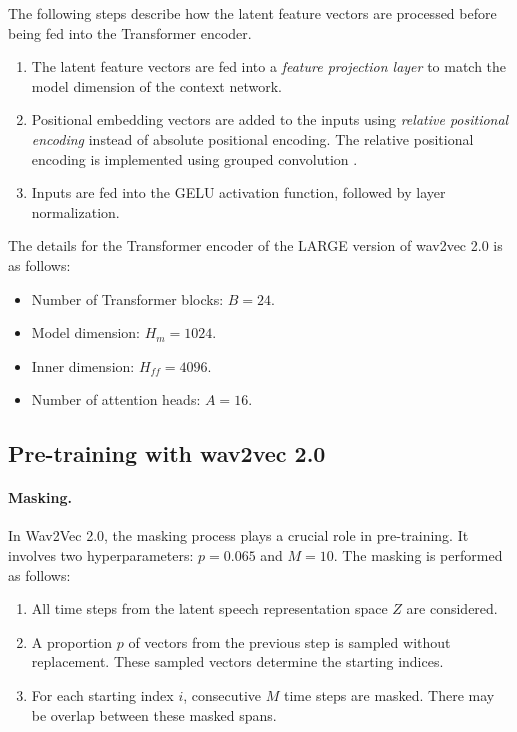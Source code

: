 The following steps describe how the latent feature vectors are processed before being fed into the Transformer encoder.
\begin{enumerate}
    \item The latent feature vectors are fed into a \emph{feature projection layer} to match the model dimension of the context network.
    \item Positional embedding vectors are added to the inputs using \emph{relative positional encoding} \cite{shaw2018relative} instead of absolute positional encoding.
    The relative positional encoding is implemented using grouped convolution \cite{AlexNet}.
    \item Inputs are fed into the GELU activation function, followed by layer normalization.
\end{enumerate}


The details for the Transformer encoder of the \textsc{LARGE} version of wav2vec 2.0 is as follows:
\begin{itemize}
    \item Number of Transformer blocks: $B = 24$.
    \item Model dimension: $H_m = 1024$.
    \item Inner dimension: $H_{ff} = 4096$.
    \item Number of attention heads: $A = 16$.
\end{itemize}

\newpage
\subsection{Pre-training with wav2vec 2.0}

\paragraph*{Masking.}
In Wav2Vec 2.0, the masking process plays a crucial role in pre-training. 
It involves two hyperparameters: $p = 0.065$ and $M = 10$. 
The masking is performed as follows:
\begin{enumerate}
    \item All time steps from the latent speech representation space $Z$ are considered.
    \item A proportion $p$ of vectors from the previous step is sampled without replacement. These sampled vectors determine the starting indices.
    \item For each starting index $i$, consecutive $M$ time steps are masked. There may be overlap between these masked spans.
\end{enumerate}

